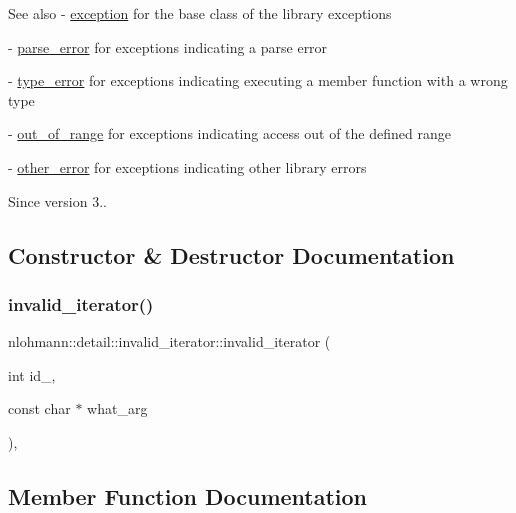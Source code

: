 \begin{DoxySeeAlso}{See also}
-\/ \hyperlink{classnlohmann_1_1detail_1_1exception}{exception} for the base class of the library exceptions 

-\/ \hyperlink{classnlohmann_1_1detail_1_1parse__error}{parse\+\_\+error} for exceptions indicating a parse error 

-\/ \hyperlink{classnlohmann_1_1detail_1_1type__error}{type\+\_\+error} for exceptions indicating executing a member function with a wrong type 

-\/ \hyperlink{classnlohmann_1_1detail_1_1out__of__range}{out\+\_\+of\+\_\+range} for exceptions indicating access out of the defined range 

-\/ \hyperlink{classnlohmann_1_1detail_1_1other__error}{other\+\_\+error} for exceptions indicating other library errors
\end{DoxySeeAlso}
\begin{DoxySince}{Since}
version 3.. 
\end{DoxySince}


\subsection{Constructor \& Destructor Documentation}
\mbox{\label{classnlohmann_1_1detail_1_1invalid__iterator_adf4a6697420f3bddb4addfc0b98f6ee2}} 
\subsubsection{\texorpdfstring{invalid\+\_\+iterator()}{invalid\_iterator()}}
{\footnotesize\ttfamily nlohmann\+::detail\+::invalid\+\_\+iterator\+::invalid\+\_\+iterator (\begin{DoxyParamCaption}\item[{int}]{id\+\_\+,  }\item[{const char $\ast$}]{what\+\_\+arg }\end{DoxyParamCaption})\hspace{0.3cm}{\ttfamily [inline]}, {\ttfamily [private]}}



\subsection{Member Function Documentation}
\mbox{\label{classnlohmann_1_1detail_1_1invalid__iterator_a4e849260a3caa1b288c7e619130c6c09}} 

